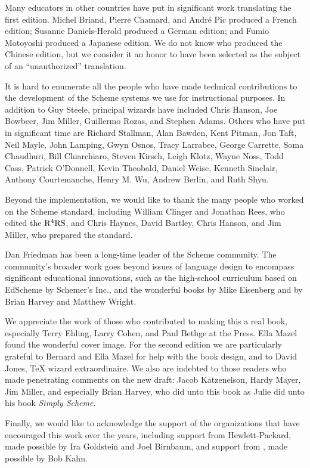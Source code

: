 Many educators in other countries have put in significant work translating the
first edition.  Michel Briand, Pierre Chamard, and Andr\'e Pic produced a
French edition; Susanne Daniels-Herold produced a German edition; and Fumio
Motoyoshi produced a Japanese edition.  We do not know who produced the Chinese
edition, but we consider it an honor to have been selected as the subject of an
``unauthorized'' translation.

It is hard to enumerate all the people who have made technical contributions to
the development of the Scheme systems we use for instructional purposes.  In
addition to Guy Steele, principal wizards have included Chris Hanson, Joe
Bowbeer, Jim Miller, Guillermo Rozas, and Stephen Adams.  Others who have put
in significant time are Richard Stallman, Alan Bawden, Kent Pitman, Jon Taft,
Neil Mayle, John Lamping, Gwyn Osnos, Tracy Larrabee, George Carrette, Soma
Chaudhuri, Bill Chiarchiaro, Steven Kirsch, Leigh Klotz, Wayne Noss, Todd Cass,
Patrick O'Donnell, Kevin Theobald, Daniel Weise, Kenneth Sinclair, Anthony
Courtemanche, Henry M. Wu, Andrew Berlin, and Ruth Shyu.

Beyond the  implementation, we would like to thank the many people
who worked on the  Scheme standard, including William Clinger and
Jonathan Rees, who edited the \( \rm R^4RS \), and Chris Haynes, David Bartley,
Chris Hanson, and Jim Miller, who prepared the  standard.

Dan Friedman has been a long-time leader of the Scheme community.  The
community's broader work goes beyond issues of language design to encompass
significant educational innovations, such as the high-school curriculum based
on EdScheme by Schemer's Inc., and the wonderful books by Mike Eisenberg and by
Brian Harvey and Matthew Wright.

We appreciate the work of those who contributed to making this a real book,
especially Terry Ehling, Larry Cohen, and Paul Bethge at the 
Press.  Ella Mazel found the wonderful cover image.  For the second edition we
are particularly grateful to Bernard and Ella Mazel for help with the book
design, and to David Jones, {\TeX} wizard extraordinaire.  We also are indebted
to those readers who made penetrating comments on the new draft: Jacob
Katzenelson, Hardy Mayer, Jim Miller, and especially Brian Harvey, who did unto
this book as Julie did unto his book \textit{Simply Scheme}.

Finally, we would like to acknowledge the support of the organizations that
have encouraged this work over the years, including support from
Hewlett-Packard, made possible by Ira Goldstein and Joel Birnbaum, and support
from , made possible by Bob Kahn.
